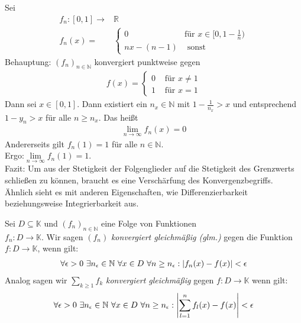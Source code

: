 \begin{Beispiel}{
	Sei 
	\begin{align*}
		f_n: [0,1] \rightarrow & \mathbb{R} \\
		f_n(x) = & \begin{cases} 0 & \text{für } x 
			\in [0, 1 - \frac{1}{n}) \\ nx - (n-1) & \text{ sonst}
			\end{cases}
	\end{align*}
		Behauptung: $(f_n)_{n \in \mathbb{N}}$ konvergiert punktweise gegen 
	\begin{align*}
		f(x) = \begin{cases} 0 & \text{ für } x \neq 1 \\
		1 & \text{ für } x = 1 \end{cases}
	\end{align*}
	Dann sei $x \in [0,1]$. Dann existiert ein $n_x \in \mathbb{N}$ mit 
	$1- \frac{1}{n_x} > x$ und entsprechend $1 - y_n > x$ für alle $n \geq n_x$. 
	Das heißt
\begin{align*}
		\lim \limits_{n \rightarrow \infty}{ f_n(x)} = 0
	\end{align*}
	Andererseits gilt $f_n(1) = 1$ für alle $n \in \mathbb{N}$. \\
	Ergo:$\lim\limits_{n\rightarrow \infty}{f_n(1) = 1}$. \\
	Fazit: Um aus der Stetigkeit der Folgenglieder auf die Stetigkeit des Grenzwerts 
	schließen zu können, braucht es eine Verschärfung des Konvergenzbegriffs.
	Ähnlich sieht es mit anderen Eigenschaften, wie Differenzierbarkeit 
	beziehungsweise Integrierbarkeit aus.
}\end{Beispiel}

\begin{Definition}{\label{def:glm_konv}
	Sei $D \subseteq \mathbb{K}$ und $(f_n)_{n \in \mathbb{N}}$ eine Folge von 
	Funktionen \\ $f_n: D \rightarrow \mathbb{K}$. Wir sagen $(f_n)$ 
	\emph{konvergiert gleichmäßig (glm.)} gegen die Funktion $f: D \rightarrow 
	\mathbb{K}$, wenn gilt:
	\begin{align*}
		\forall \epsilon > 0 \text{ } \exists n_{\epsilon} \in \mathbb{N} 
			\text{ } \forall x \in D \text{ } \forall n \geq n_{\epsilon} 
			: \abs{f_n(x) - f(x)} < \epsilon
	\end{align*}
	Analog sagen wir $\sum_{k \geq 1} f_k$ \emph{konvergiert gleichmäßig} gegen 
	$f: D \rightarrow \mathbb{K}$ wenn gilt:
	\begin{align*}
		\forall \epsilon > 0 \text{ } \exists n_{\epsilon} \in \mathbb{N} 
			\text{ } \forall x \in D \text{ } \forall n \geq n_{\epsilon}: 
			\abs{\sum_{l=1}^n f_l(x) - f(x)} < \epsilon
	\end{align*}
}\end{Definition}

